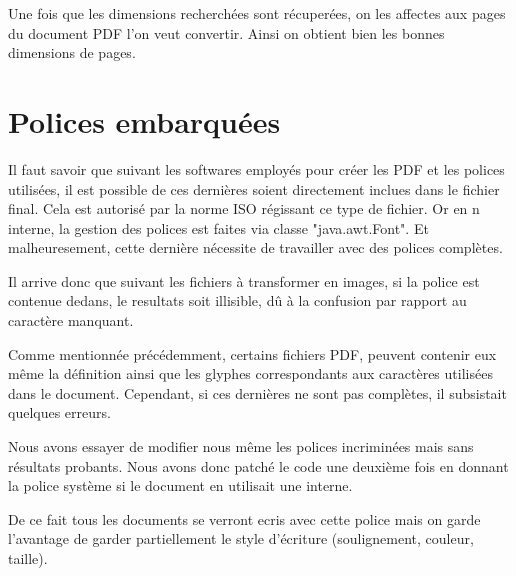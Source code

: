         Une fois que les dimensions recherchées sont récuperées, on les affectes
    aux pages du document PDF l'on veut convertir. Ainsi on obtient bien les bonnes 
    dimensions de pages.



    \section{Polices embarquées}
        Il faut savoir que suivant les softwares employés pour créer les PDF et
    les polices utilisées, il est possible de ces dernières soient directement
    inclues dans le fichier final. Cela est autorisé par la norme ISO régissant 
    ce type de fichier. Or en n interne, la gestion des polices est faites via 
    classe "java.awt.Font". Et malheuresement, cette dernière nécessite de travailler
    avec des polices complètes.

        Il arrive donc que suivant les fichiers à transformer en images, si la police 
    est contenue dedans, le resultats soit illisible, dû à la confusion par rapport
    au caractère manquant.


        Comme mentionnée précédemment, certains fichiers PDF, peuvent contenir eux 
    même la définition ainsi que les glyphes correspondants aux caractères utilisées dans 
    le document. Cependant, si ces dernières ne sont pas complètes, il subsistait
    quelques erreurs.

        Nous avons essayer de modifier nous même les polices incriminées mais 
    sans résultats probants. Nous avons donc patché le code une deuxième fois 
    en donnant la police système si le document en utilisait une interne.

        De ce fait tous les documents se verront ecris avec cette police mais 
    on garde l'avantage de garder partiellement le style d'écriture 
    (soulignement, couleur, taille).







